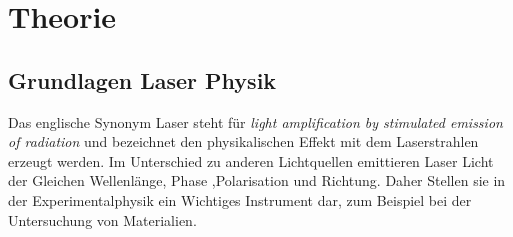 \section{Theorie}
\label{sec:Theorie}

\subsection{Grundlagen Laser Physik}
\label{sec:Grundlagen}
Das englische Synonym Laser steht für \textit{light amplification by stimulated emission of radiation}
und bezeichnet den physikalischen Effekt mit dem  Laserstrahlen erzeugt werden.
Im Unterschied zu anderen Lichtquellen emittieren Laser Licht der Gleichen Wellenlänge, Phase ,Polarisation und Richtung. 
Daher Stellen sie in der Experimentalphysik ein Wichtiges Instrument dar,
zum Beispiel bei der Untersuchung von Materialien.

